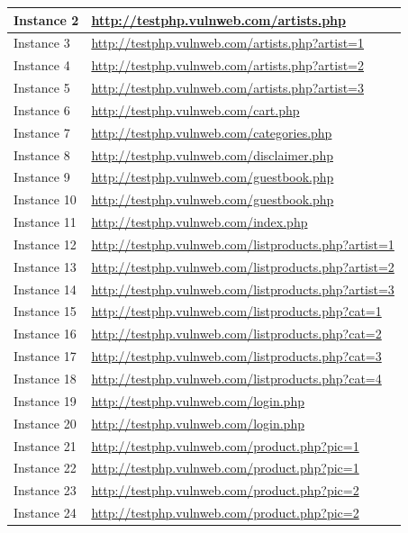 \documentclass[12pt]{article}
\begin{document}
\begin{center}
\begin{longtable}{|l|p{10cm}|}
\hline
Instance 2 & \url{http://testphp.vulnweb.com/artists.php} \\
\hline
Instance 3 & \url{http://testphp.vulnweb.com/artists.php?artist=1} \\
\hline
Instance 4 & \url{http://testphp.vulnweb.com/artists.php?artist=2} \\
\hline
Instance 5 & \url{http://testphp.vulnweb.com/artists.php?artist=3} \\
\hline
Instance 6 & \url{http://testphp.vulnweb.com/cart.php} \\
\hline
Instance 7 & \url{http://testphp.vulnweb.com/categories.php} \\
\hline
Instance 8 & \url{http://testphp.vulnweb.com/disclaimer.php} \\
\hline
Instance 9 & \url{http://testphp.vulnweb.com/guestbook.php} \\
\hline
Instance 10 & \url{http://testphp.vulnweb.com/guestbook.php} \\
\hline
Instance 11 & \url{http://testphp.vulnweb.com/index.php} \\
\hline
Instance 12 & \url{http://testphp.vulnweb.com/listproducts.php?artist=1} \\
\hline
Instance 13 & \url{http://testphp.vulnweb.com/listproducts.php?artist=2} \\
\hline
Instance 14 & \url{http://testphp.vulnweb.com/listproducts.php?artist=3} \\
\hline
Instance 15 & \url{http://testphp.vulnweb.com/listproducts.php?cat=1} \\
\hline
Instance 16 & \url{http://testphp.vulnweb.com/listproducts.php?cat=2} \\
\hline
Instance 17 & \url{http://testphp.vulnweb.com/listproducts.php?cat=3} \\
\hline
Instance 18 & \url{http://testphp.vulnweb.com/listproducts.php?cat=4} \\
\hline
Instance 19 & \url{http://testphp.vulnweb.com/login.php} \\
\hline
Instance 20 & \url{http://testphp.vulnweb.com/login.php} \\
\hline
Instance 21 & \url{http://testphp.vulnweb.com/product.php?pic=1} \\
\hline
Instance 22 & \url{http://testphp.vulnweb.com/product.php?pic=1} \\
\hline
Instance 23 & \url{http://testphp.vulnweb.com/product.php?pic=2} \\
\hline
Instance 24 & \url{http://testphp.vulnweb.com/product.php?pic=2} \\

\end{longtable}
\end{center}
\end{document}
